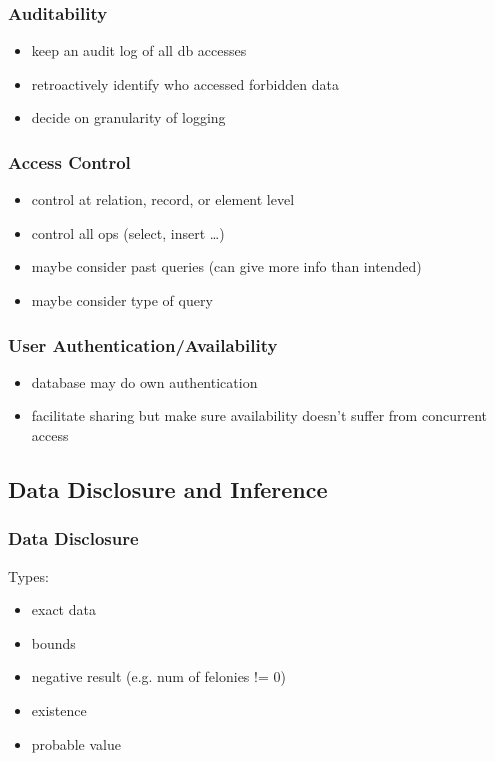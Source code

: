 \documentclass[]{article}
\theoremstyle{definition}
\begin{document}
	\subsubsection{Auditability}
	\begin{itemize}
		\item keep an audit log of all db accesses
		\item retroactively identify who accessed forbidden data
		\item decide on granularity of logging
	\end{itemize}

	\subsubsection{Access Control}
	\begin{itemize}
		\item control at relation, record, or element level
		\item control all ops (select, insert \ldots)	
		\item maybe consider past queries (can give more info than intended)
		\item maybe consider type of query
	\end{itemize}

	\subsubsection{User Authentication/Availability}
	\begin{itemize}
		\item database may do own authentication
		\item facilitate sharing but make sure availability doesn't suffer from concurrent access
	\end{itemize}

	\subsection{Data Disclosure and Inference}
	
	\subsubsection{Data Disclosure}
	Types:
	\begin{itemize}
		\item exact data
		\item bounds
		\item negative result (e.g. num of felonies != 0)
		\item existence 
		\item probable value
	\end{itemize}
\end{document}
